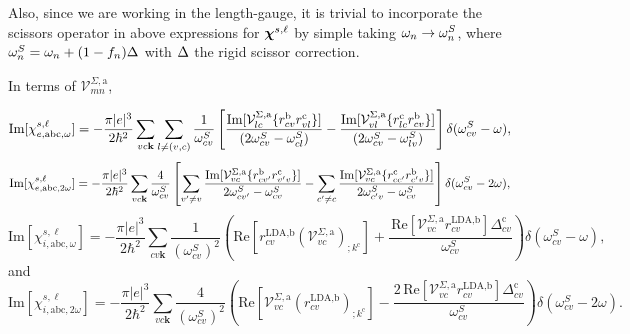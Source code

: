 \documentclass[floatfix,prb,aps,superscriptaddress,11pt,preprint]{revtex4}
\begin{document}
Also, since we are working in the length-gauge, it is trivial to
incorporate the scissors operator in above expressions for $\boldsymbol{\chi}^{s,\ell}$
by simple taking
$\omega_n\to\omega_n^S$, where $\omega_n^S=\omega_n+(1-f_n)\Delta$ with $\Delta$ the
rigid scissor correction.\cite{nastosPRB05,cabellosPRB09}

In terms of $\mathcal{V}^{\Sigma,\text{a}}_{mn}$,

\begin{equation}\label{calvimchiewn}
\mathrm{Im}[\chi_{e,\mathrm{a}\mathrm{b}\mathrm{c},\omega}^{s,\ell}] =
-\frac{\pi |e|^3}{2\hbar^2}\sum_{vc\mathbf{k}}\sum_{l\neq(v,c)}\frac{1}{\omega^{S}_{cv}}
\left[
\frac{\mathrm{Im}[\mathcal{V}^{\Sigma,\text{a}}_{lc}\{r^{\mathrm{b}}_{cv}r^{\mathrm{c}}_{vl}\}]}{(2\omega^S_{cv}-\omega^S_{cl})}
-\frac{\mathrm{Im}[\mathcal{V}^{\Sigma,\text{a}}_{vl}\{r^{\mathrm{c}}_{lc}r^{\mathrm{b}}_{cv}\}]}{(2\omega^S_{cv}-\omega^S_{lv})}
\right]\delta(\omega^S_{cv}-\omega),
\end{equation}  
\begin{equation}\label{calvimchie2wn}
\mathrm{Im}[\chi_{e,\mathrm{a}\mathrm{b}\mathrm{c},2\omega}^{s,\ell}] =
-\frac{\pi |e|^3}{2\hbar^2}\sum_{vc\mathbf{k}}\frac{4}{\omega^{S}_{cv}}
\left[
\sum_{v'\ne v}\frac{\mathrm{Im}[\mathcal{V}^{\Sigma,\text{a}}_{vc}\{r^{\mathrm{b}}_{cv'}r^{\mathrm{c}}_{v'v}\}]}{2\omega^S_{cv'}-\omega^S_{cv}}
- \sum_{c'\ne c}\frac{\mathrm{Im}[\mathcal{V}^{\Sigma,\text{a}}_{vc}\{r^{\mathrm{c}}_{cc'}r^{\mathrm{b}}_{c'v}\}]}{2\omega^S_{c'v}-\omega^S_{cv}}
\right]\delta(\omega^S_{cv}-2\omega),
\end{equation}
\begin{equation}\label{calvimchiwn}
\mathrm{Im}[\chi_{i,\text{a}\text{b}\text{c},\omega}^{s,\ell}]
= -\frac{\pi\vert e\vert^3}{2\hbar^2}\sum_{cv\mathbf{k}}\frac{1}{(\omega^{S}_{cv})^{2}}
\left(
\mathrm{Re}\left[r^{\text{LDA,b}}_{cv}\left(\mathcal{V}^{\Sigma,\text{a}}_{vc}\right)_{;k^{\text{c}}}\right]
+\frac{\,\mathrm{Re}\left[\mathcal{V}^{\Sigma,\text{a}}_{vc}r^{\text{LDA,b}}_{cv}\right]\Delta^{\text{c}}_{cv}}{\omega^{S}_{cv}} 
\right)\delta(\omega^{S}_{cv}-\omega),
\end{equation}
and
\begin{equation}\label{calvimchi2wn}
\mathrm{Im}[\chi_{i,\text{a}\text{b}\text{c},2\omega}^{s,\ell}] = -\frac{\pi \vert e\vert^{3}}{2\hbar^2}\sum_{vc\mathbf{k}}\frac{4}{(\omega^{S}_{cv})^{2}}\left(\mathrm{Re}\left[\mathcal{V}^{\Sigma,\text{a}}_{vc}\left(r^{\text{LDA,b}}_{cv}\right)_{;k^{\text{c}}}\right] - \frac{2\,\mathrm{Re}\left[\mathcal{V}^{\Sigma,\text{a}}_{vc}r^{\text{LDA,b}}_{cv}\right]\Delta^{\text{c}}_{cv}}{\omega^{S}_{cv}}\right)\delta(\omega^{S}_{cv}-2\omega).
\end{equation}
\end{document}
